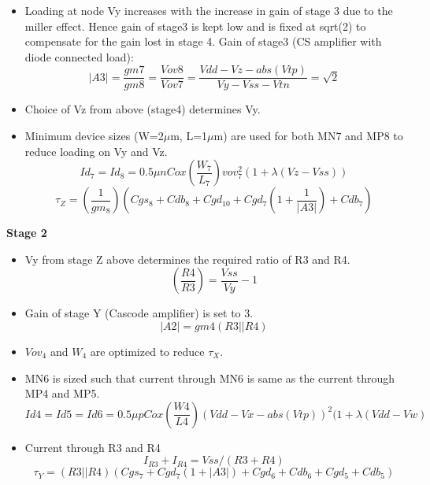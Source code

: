 \documentclass[12pt,a4paper]{article}
\begin{document}
\begin{itemize}
	\item Loading at node Vy increases with the increase in gain of stage 3 due to the miller effect. Hence gain of stage3 is kept low and is fixed at sqrt(2) to compensate for the gain lost in stage 4. Gain of stage3 (CS amplifier with diode connected load):
	\begin{equation}
		|A3|=\frac{gm7}{gm8}=\frac{Vov8}{Vov7}=\frac{Vdd-Vz-abs(Vtp)}{Vy-Vss-Vtn}=\sqrt{2}
	\end{equation}

	\item Choice of Vz from above (stage4) determines Vy.	
	\item Minimum device sizes (W=2$\mu$m, L=1$\mu$m) are used for both MN7 and MP8 to reduce loading on Vy and Vz.
	\begin{equation}
		Id_7=Id_8=0.5\mu nCox(\frac{W_7}{L_7})vov_7^{2} (1+\lambda(Vz-Vss))
	\end{equation}
	\begin{equation}
		\tau_Z=(\frac{1}{gm_8})(Cgs_8+Cdb_8+Cgd_{10}+Cgd_7(1+\frac{1}{|A3|})+Cdb_7)
	\end{equation}
\end{itemize}


\textbf{Stage 2}

\begin{itemize}
	\item Vy from stage Z above determines the required ratio of R3 and R4.
	\begin{equation}
		(\frac{R4}{R3})=\frac{Vss}{Vy}-1
	\end{equation}

	\item Gain of stage Y (Cascode amplifier) is set to 3.
	\begin{equation}
		|A2|=gm4(R3 || R4)
	\end{equation}
	\item $Vov_4$ and $W_{4}$ are optimized to reduce $\tau_X$.
\end{itemize}




\begin{itemize}
	\item MN6 is sized such that current through MN6 is same as the current through MP4 and MP5. 
	\begin{equation}
		Id4=Id5=Id6=0.5\mu pCox(\frac{W4}{L4})(Vdd-Vx-abs(Vtp))^{2} (1+\lambda (Vdd-Vw)
	\end{equation}
	\item Current through R3 and R4
	\begin{equation}
		I_{R3}+I_{R4}=Vss/(R3+R4)
	\end{equation}
	\begin{equation}
		\tau_Y=(R3 || R4)(Cgs_7+Cgd_7 (1+|A3|)+Cgd_6+Cdb_6+Cgd_5+Cdb_5)
	\end{equation}
\end{itemize}
\end{document}
